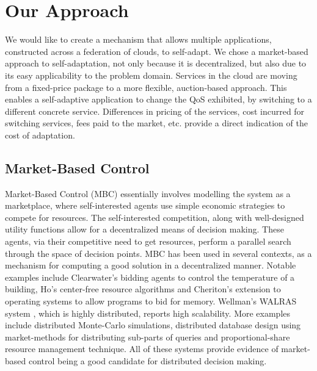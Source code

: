 \documentclass[10pt,journal,compsoc]{IEEEtran}
\begin{document}
\section{Our Approach}
We would like to create a mechanism that allows multiple applications, constructed across a federation of clouds, to self-adapt. We chose a market-based approach to self-adaptation, not only because it is decentralized, but also due to its easy applicability to the problem domain. Services in the cloud are moving from a fixed-price package to a more flexible, auction-based approach\cite{Amazon2010SpotInstance}. This enables a self-adaptive application to change the QoS exhibited, by switching to a different concrete service. Differences in pricing of the services, cost incurred for switching services, fees paid to the market, etc. provide a direct indication of the cost of adaptation. 
\subsection{Market-Based Control}
Market-Based Control (MBC) essentially involves modelling the system as a marketplace, where self-interested agents use simple economic strategies to compete for resources. The self-interested competition, along with well-designed utility functions allow for a decentralized means of decision making. These agents, via their competitive need to get resources, perform a parallel search through the space of decision points. MBC has been used in several contexts, as a mechanism for computing a good solution in a decentralized manner. Notable examples include Clearwater's bidding agents to control the temperature of a building\cite{Clearwater1996Saving}, Ho's center-free resource algorithms \cite{Ho1980class} and Cheriton's extension to operating systems to allow programs to bid for memory\cite{Harty1996market}. Wellman's WALRAS system \cite{Wellman1993market-oriented}, which is highly distributed, reports high scalability. More examples include distributed Monte-Carlo simulations\cite{Waldspurger1992Spawn}, distributed database design using market-methods for distributing sub-parts of queries \cite{Stonebraker1994Economic} and proportional-share resource management technique\cite{Waldspurger1994Lottery}. All of these systems provide evidence of market-based control being a good candidate for distributed decision making. 
\end{document}
